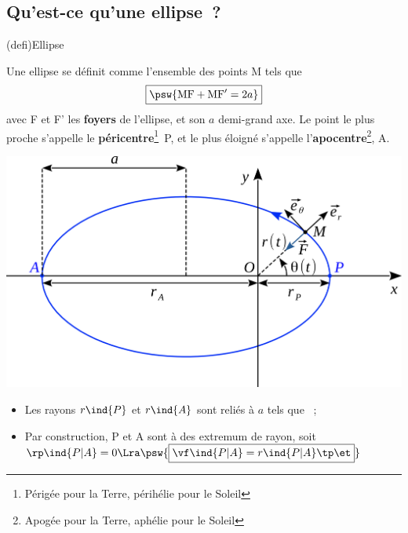\documentclass[../../main/main.tex]{subfiles}
\begin{document}
\subsection{Qu'est-ce qu'une ellipse~?}
\begin{tcb*}(defi){Ellipse}
  \begin{isd}[righthand ratio=.45]
    Une ellipse se définit comme l'ensemble des points M tels que
    \[\boxed{\psw{{\rm MF}+{\rm MF'} = 2a}}\]
    avec F et F' les \textbf{foyers} de l'ellipse, et son $a$ demi-grand axe.
    \smallbreak
    Le point le plus proche s'appelle le \textbf{péricentre}\footnote{Périgée
    pour la Terre, périhélie pour le Soleil}~P, et le plus éloigné
    s'appelle l'\textbf{apocentre}\footnote{Apogée pour la Terre, aphélie pour
    le Soleil}, A.
    \tcblower
    \begin{center}
      \includegraphics[width=\linewidth]{ell_def}
    \end{center}
  \end{isd}
  \begin{itemize}
    \item Les rayons $r\ind{P}$ et $r\ind{A}$ sont reliés à $a$ tels que
    ~;
    \vspace{-10pt}
    \item Par construction, P et A sont à des extremum de rayon, soit
      $\rp\ind{P|A} = 0 \Lra \psw{\boxed{\vf\ind{P|A} = r\ind{P|A}\tp \et}}$
  \end{itemize}
\end{tcb*}
\end{document}
